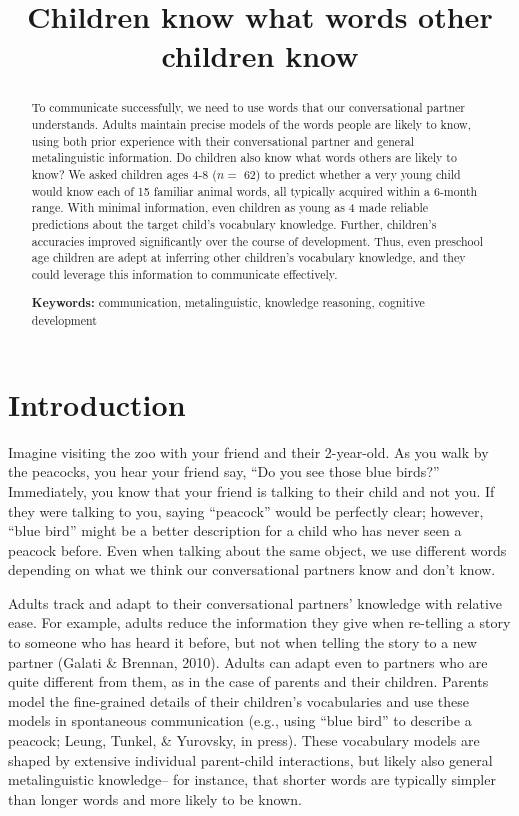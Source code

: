 \documentclass[10pt, letterpaper]{article}
\title{Children know what words other children know}
\begin{document}
\maketitle

\begin{abstract}
To communicate successfully, we need to use words that our
conversational partner understands. Adults maintain precise models of
the words people are likely to know, using both prior experience with
their conversational partner and general metalinguistic information. Do
children also know what words others are likely to know? We asked
children ages 4-8 (\(n =\) 62) to predict whether a very young child
would know each of 15 familiar animal words, all typically acquired
within a 6-month range. With minimal information, even children as young
as 4 made reliable predictions about the target child's vocabulary
knowledge. Further, children's accuracies improved significantly over
the course of development. Thus, even preschool age children are adept
at inferring other children's vocabulary knowledge, and they could
leverage this information to communicate effectively.

\textbf{Keywords:}
communication, metalinguistic, knowledge reasoning, cognitive
development
\end{abstract}

\hypertarget{introduction}{%
\section{Introduction}\label{introduction}}

Imagine visiting the zoo with your friend and their 2-year-old. As you
walk by the peacocks, you hear your friend say, ``Do you see those blue
birds?'' Immediately, you know that your friend is talking to their
child and not you. If they were talking to you, saying ``peacock'' would
be perfectly clear; however, ``blue bird'' might be a better description
for a child who has never seen a peacock before. Even when talking about
the same object, we use different words depending on what we think our
conversational partners know and don't know.

Adults track and adapt to their conversational partners' knowledge with
relative ease. For example, adults reduce the information they give when
re-telling a story to someone who has heard it before, but not when
telling the story to a new partner (Galati \& Brennan, 2010). Adults can
adapt even to partners who are quite different from them, as in the case
of parents and their children. Parents model the fine-grained details of
their children's vocabularies and use these models in spontaneous
communication (e.g., using ``blue bird'' to describe a peacock; Leung,
Tunkel, \& Yurovsky, in press). These vocabulary models are shaped by
extensive individual parent-child interactions, but likely also general
metalinguistic knowledge-- for instance, that shorter words are
typically simpler than longer words and more likely to be known.
\end{document}
